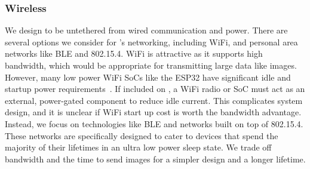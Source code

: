 \subsubsection{Wireless}
We design \name to be untethered from wired communication and power. There are several options we consider for \name's networking, including WiFi, and personal area networks like BLE and 802.15.4. WiFi is attractive as it supports high bandwidth, which would be appropriate for transmitting large data like images. However, many low power WiFi SoCs like the ESP32 have significant idle and startup power requirements~\cite{esp32}. If included on \name, a WiFi radio or SoC must act as an external, power-gated component to reduce idle current. This complicates system design, and it is unclear if WiFi start up cost is worth the bandwidth advantage. Instead, we focus on technologies like BLE and networks built on top of 802.15.4. These networks are specifically designed to cater to devices that spend the majority of their lifetimes in an ultra low power sleep state. We trade off bandwidth and the time to send images for a simpler design and a longer lifetime.
 

